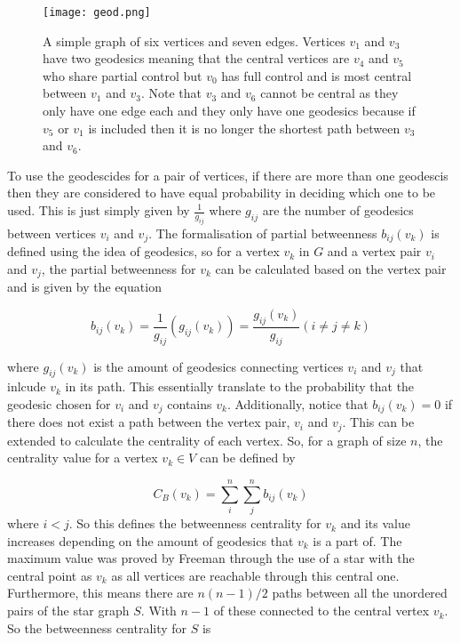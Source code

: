 \begin{figure}[!htb]
	\centering
	\texttt{[image: geod.png]}
	\caption{A simple graph of six vertices and seven edges. Vertices $v_1$ and $v_3$ have two geodesics meaning that the central vertices are $v_4$ and $v_5$ who share partial control but $v_0$ has full control and is most central between $v_1$ and $v_3$. Note that $v_3$ and $v_6$ cannot be central as they only have one edge each and they only have one geodesics because if $v_5$ or $v_1$ is included then it is no longer the shortest path between $v_3$ and $v_6$.}
	\label{fig:geodesics}
\end{figure}

To use the geodescides for a pair of vertices, if there are more than one geodescis then they are considered to have equal probability in deciding which one to be used. This is just simply given by $\frac{1}{g_{ij}}$ where $g_{ij}$ are the number of geodesics between vertices $v_i$ and $v_j$. The formalisation of partial betweenness $b_{ij}(v_k)$ is defined using the idea of geodesics, so for a vertex $v_k$ in $G$ and a vertex pair $v_i$ and $v_j$, the partial betweenness for $v_k$ can be calculated based on the vertex pair and is given by the equation

\begin{equation} \label{eq:gb}
b_{ij}(v_k) = \frac{1}{g_{ij}}(g_{ij}(v_k)) = \frac{g_{ij}(v_k)}{g_{ij}} (i \ne j \ne k)
\end{equation}

where $g_{ij}(v_k)$ is the amount of geodesics connecting vertices $v_i$ and $v_j$ that inlcude $v_k$ in its path. This essentially translate to the probability that the geodesic chosen for $v_i$ and $v_j$ contains $v_k$. Additionally, notice that $b_{ij}(v_k) = 0$ if there does not exist a path between the vertex pair, $v_i$ and $v_j$.
This can be extended to calculate the centrality of each vertex. So, for a graph of size $n$, the centrality value for a vertex $v_k \in V$ can be defined by

\begin{equation}
C_B(v_k)= \sum_i^n\sum_j^n b_{ij}(v_k)
\end{equation}
where $i < j$. So this defines the betweenness centrality for $v_k$ and its value increases depending on the amount of geodesics that $v_k$ is a part of. The maximum value\cite{freeman2002centrality} was proved by Freeman through the use of a star with the central point as $v_k$ as all vertices are reachable through this central one. Furthermore, this means there are $n(n-1)/2$ paths between all the unordered pairs of the star graph $S$. With $n-1$ of these connected to the central vertex $v_k$. So the betweenness centrality for $S$ is

